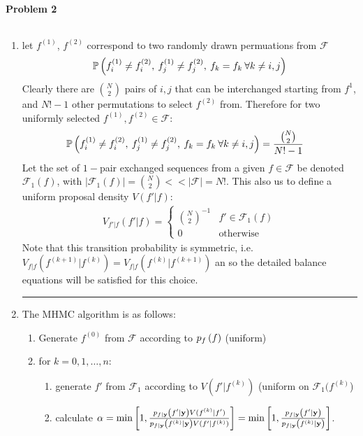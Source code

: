 \documentclass[12pt]{report}
\begin{document}
\paragraph{Problem 2}
$ $ \\
\begin{enumerate}[a]
	\item let $f^{(1)}$, $f^{(2)}$ correspond to two randomly drawn permuations from $\mathcal{F}$
	\begin{align*}
	\mathbb{P}\left( f^{(1)}_{i}\neq f^{(2)}_i,\:f^{(1)}_{j}\neq f^{(2)}_j,  \: f_k = f_k\: \forall k \neq i,j  \right)
	\end{align*}
	Clearly there are ${{N}\choose{2}}$ pairs of $i,j$ that can be interchanged starting from $f^{1}$, and $N!-1$ other permutations to select $f^{(2)}$ from. Therefore for two uniformly selected $f^{(1)},f^{(2)}\in \mathcal{F}$: 
	\begin{align*}
	\mathbb{P}\left( f^{(1)}_{i}\neq f^{(2)}_i,\:f^{(1)}_{j}\neq f^{(2)}_j,  \: f_k = f_k\: \forall k \neq i,j  \right) &= \frac{{{N}\choose{2}}}{N!-1} 
	\end{align*}
	Let the set of $1-$pair exchanged sequences from a given $f\in\mathcal{F}$ be denoted $\mathcal{F}_1(f)$, with $\left\vert \mathcal{F}_1(f)\right\vert={{N}\choose{2}}<<\left\vert \mathcal{F}\right\vert=N!$. This also us to define a uniform proposal density $V(f'\vert f)$:
	\begin{align*}
		{V}_{f'\vert f}(f'\vert f) = \begin{cases}
		{{N}\choose{2}}^{-1} & f'\in \mathcal{F}_{1}(f) \\
		0 & \text{otherwise}
		\end{cases}
	\end{align*}
	Note that this transition probability is symmetric, i.e. ${V}_{f\vert f}(f^{(k+1)}\vert f^{(k)})=V_{f\vert f}(f^{(k)}\vert f^{(k+1)})$ an so the detailed balance equations will be satisfied for this choice.
	\hrule
	\item The MHMC algorithm is as follows:
	\begin{enumerate}[1]
		\item Generate $f^{(0)}$ from $\mathcal{F}$ according to $p_{{f}}\left( f \right)$ (uniform)
		\item for $k=0,1,\hdots,n$:
		\begin{enumerate}[i]
			\item generate $f'$ from $\mathcal{F}_1$ according to $V(f'\vert f^{(k)})$ (uniform on $\mathcal{F}_{1}(f^{(k)}$)
			\item calculate $\alpha = \min \left[1,\frac{p_{f\vert \mathbf{y}}\left( f' \vert \mathbf{y} \right){V}(f^{(k)}\vert f')}{p_{f\vert \mathbf{y}}\left( f^{(k)} \vert \mathbf{y} \right){V}(f'\vert f^{(k)})}\right]=\min \left[1,\frac{p_{f\vert \mathbf{y}}\left( f' \vert \mathbf{y} \right)}{p_{f\vert \mathbf{y}}\left( f^{(k)} \vert \mathbf{y} \right)}\right]$. 

\end{enumerate}
\end{enumerate}
\end{enumerate}
\end{document}
